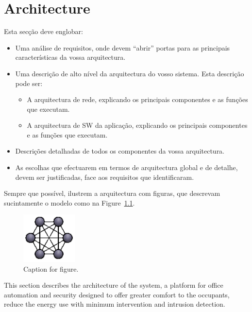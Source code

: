 \chapter{Architecture}
\label{chapter:architecture}
Esta secção deve englobar:

\begin{itemize}
    \item Uma análise de requisitos, onde devem “abrir” portas para as principais
        características da vossa arquitectura.
    \item Uma descrição de alto nível da arquitectura do vosso sistema. Esta descrição
        pode ser:
        \begin{itemize}
            \item A arquitectura de rede, explicando os principais componentes e as
                funções que executam.
            \item A arquitectura de SW da aplicação, explicando os principais
                componentes e as funções que executam.
        \end{itemize}
    \item Descrições detalhadas de todos os componentes da vossa arquitectura.
    \item As escolhas que efectuarem em termos de arquitectura global e de detalhe,
        devem ser justificadas, face aos requisitos que identificaram.
\end{itemize}

Sempre que possível, ilustrem a arquitectura com figuras, que descrevam
sucintamente o modelo como na Figure~\ref{fig:logoCNM}.

\begin{figure}[!htb]
  \centering
  \includegraphics[width=0.25\textwidth]{Figures/logoCNM.png}
  \caption[Caption for figure in TOC]{Caption for figure.}
  \label{fig:logoCNM}
\end{figure}



This section describes the architecture of the system, a platform for office automation and security designed to offer greater comfort to the occupants, reduce the energy use with minimum intervention and intrusion detection.

